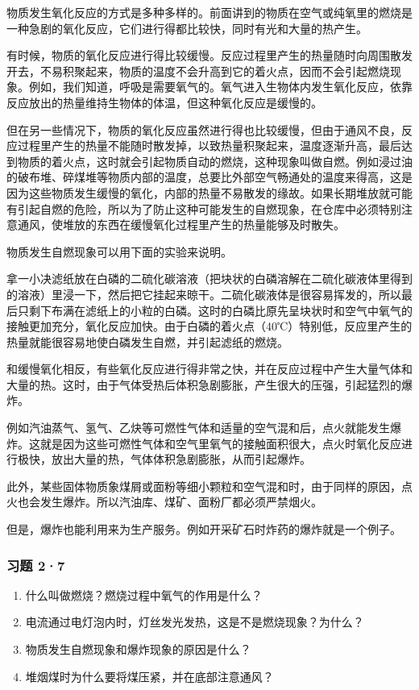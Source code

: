 物质发生氧化反应的方式是多种多样的。前面讲到的物质在空气或纯氧里的燃烧是一种急剧的氧化反应，它们进行得都比较快，同时有光和大量的热产生。

有时候，物质的氧化反应进行得比较缓慢。反应过程里产生的热量随时向周围散发开去，不易积聚起来，物质的温度不会升高到它的着火点，因而不会引起燃烧现象。例如，我们知道，呼吸是需要氧气的。氧气进入生物体内发生氧化反应，依靠反应放出的热量维持生物体的体温，但这种氧化反应是缓慢的。

但在另一些情况下，物质的氧化反应虽然进行得也比较缓慢，但由于通风不良，反应过程里产生的热量不能随时散发掉，以致热量积聚起来，温度逐渐升高，最后达到物质的着火点，这时就会引起物质自动的燃烧，这种现象叫做自燃。例如浸过油的破布堆、碎煤堆等物质内部的温度，总要比外部空气畅通处的温度来得高，这是因为这些物质发生缓慢的氧化，内部的热量不易散发的缘故。如果长期堆放就可能有引起自燃的危险，所以为了防止这种可能发生的自燃现象，在仓库中必须特别注意通风，使堆放的东西在缓慢氧化过程里产生的热量能够及时散失。

物质发生自燃现象可以用下面的实验来说明。

拿一小决滤纸放在白磷的二硫化碳溶液（把块状的白磷溶解在二硫化碳液体里得到的溶液）里浸一下，然后把它挂起来晾干。二硫化碳液体是很容易挥发的，所以最后只剩下布满在滤纸上的小粒的白磷。这时的白磷比原先呈块状时和空气中氧气的接触更加充分，氧化反应加快。由于白磷的着火点（40℃）特别低，反应里产生的热量就能很容易地使白磷发生自燃，并引起滤纸的燃烧。

和缓慢氧化相反，有些氧化反应进行得非常之快，并在反应过程中产生大量气体和大量的热。这时，由于气体受热后体积急剧膨胀，产生很大的压强，引起猛烈的爆炸。

例如汽油蒸气、氢气、乙炔等可燃性气体和适量的空气混和后，点火就能发生爆炸。这就是因为这些可燃性气体和空气里氧气的接触面积很大，点火时氧化反应进行极快，放出大量的热，气体体积急剧膨胀，从而引起爆炸。

此外，某些固体物质象煤屑或面粉等细小颗粒和空气混和时，由于同样的原因，点火也会发生爆炸。所以汽油库、煤矿、面粉厂都必须严禁烟火。

但是，爆炸也能利用来为生产服务。例如开采矿石时炸药的爆炸就是一个例子。

\subsubsection{习题 2·7}

\begin{enumerate}
\item
  什么叫做燃烧？燃烧过程中氧气的作用是什么？
\item
  电流通过电灯泡内时，灯丝发光发热，这是不是燃烧现象？为什么？
\item
  物质发生自燃现象和爆炸现象的原因是什么？
\item
  堆烟煤时为什么要将煤压紧，并在底部注意通风？
\end{enumerate}

